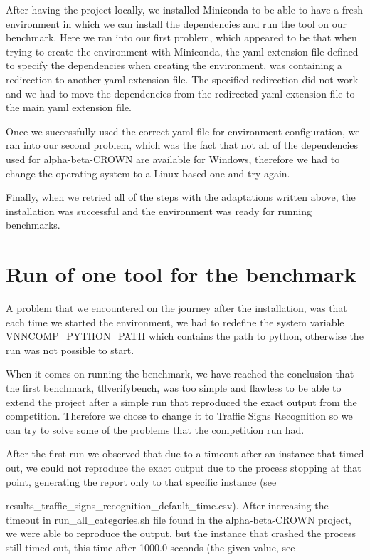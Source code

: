 \documentclass[12pt,a4paper]{report}
\newcommand\tab[1][5mm]{\hspace*{#1}}
\begin{document}
After having the project locally, we installed Miniconda\cite{miniconda} to be able to have a fresh environment in which we can install the dependencies and run the tool on our benchmark. Here we ran into our first problem, which appeared to be that when trying to create the environment with Miniconda\cite{miniconda}, the yaml extension file defined to specify the dependencies when creating the environment, was containing a redirection to another yaml extension file. The specified redirection did not work and we had to move the dependencies from the redirected yaml extension file to the main yaml extension file.

Once we successfully used the correct yaml file for environment configuration, we ran into our second problem, which was the fact that not all of the dependencies used for alpha-beta-CROWN are available for Windows, therefore we had to change the operating system to a Linux based one and try again.

Finally, when we retried all of the steps with the adaptations written above, the installation was successful and the environment was ready for running benchmarks.

\chapter{Run of one tool for the benchmark}
\tab A problem that we encountered on the journey after the installation, was that each time we started the environment, we had to redefine the system variable VNNCOMP\_PYTHON\_PATH which contains the path to python, otherwise the run was not possible to start.

When it comes on running the benchmark, we have reached the conclusion that the first benchmark, tllverifybench\cite{tll_verify_bench}, was too simple and flawless to be able to extend the project after a simple run that reproduced the exact output from the competition. Therefore we chose to change it to Traffic Signs Recognition\cite{traffic_signs_recognition} so we can try to solve some of the problems that the competition run had.

After the first run we observed that due to a timeout after an instance that timed out, we could not reproduce the exact output due to the process stopping at that point, generating the report only to that specific instance (see

results\_traffic\_signs\_recognition\_default\_time.csv\cite{traffic_signs_recognition_first_solution}). After increasing the timeout in run\_all\_categories.sh file found in the alpha-beta-CROWN project, we were able to reproduce the output, but the instance that crashed the process still timed out, this time after 1000.0 seconds (the given value, see
\end{document}

